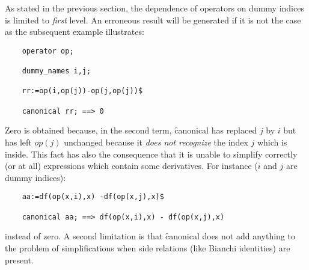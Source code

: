 As stated in the previous section, the dependence of operators on dummy 
indices is limited to \emph{first} level. An erroneous result
will be generated if it is not the case as the subsequent example 
illustrates:
\begin{verbatim}
    operator op;

    dummy_names i,j;

    rr:=op(i,op(j))-op(j,op(j))$

    canonical rr; ==> 0
\end{verbatim}
Zero is obtained because, in the second term, \f{canonical} has replaced 
$j$ by $i$ but has left $op(j)$ unchanged because it \emph{does not recognize}
the index $j$ which is inside. This fact has also the consequence that 
it is unable to simplify correctly (or at all) expressions which 
contain some derivatives.
For instance ($i$ and $j$ are dummy indices):
\begin{verbatim}
    aa:=df(op(x,i),x) -df(op(x,j),x)$

    canonical aa; ==> df(op(x,i),x) - df(op(x,j),x)
\end{verbatim} 
instead of zero.
A second limitation is that \f{canonical} does not add anything to the
 problem of simplifications when side relations (like Bianchi identities) 
 are present.
\iffalse
